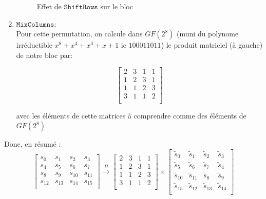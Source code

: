 \documentclass[a4paper, 12pt]{article}
\begin{document}
\begin{enumerate}
\begin{figure}[H]
		\caption{Effet de $\mathtt{ShiftRows}$ sur le bloc}
		\label{illu_shiftrows}
		\end{figure}

	\item $\mathtt{MixColumns}$: \\
		Pour cette permutation, on calcule dans $GF\left(2^8\right)$ (muni du polynome irréductible $x^8 + x^4 + x^3 + x + 1$ ie $100011011$) le produit matriciel (à gauche) de notre bloc par:
		
		$$
		\begin{bmatrix}
			2 & 3 & 1 & 1 \\
			1 & 2 & 3 & 1 \\
			1 & 1 & 2 & 3 \\
			3 & 1 & 1 & 2 \\
		\end{bmatrix}
		$$
		
		avec les éléments de cette matrices à comprendre comme des éléments de $GF\left(2^8\right)$ 
\end{enumerate}

\noindent Donc, en résumé : 
$$
\begin{bmatrix}
	s_{0} & s_{1} & s_{2} & s_{3} \\
	s_{4} & s_{5} & s_{6} & s_{7} \\
	s_{8} & s_{9} & s_{10} & s_{11} \\
	s_{12} & s_{13} & s_{14} & s_{15} \\
\end{bmatrix}
\overset{\Pi}{\rightarrow}
\begin{bmatrix}
	2 & 3 & 1 & 1 \\
	1 & 2 & 3 & 1 \\
	1 & 1 & 2 & 3 \\
	3 & 1 & 1 & 2 \\
\end{bmatrix}
\times
\begin{bmatrix}
	\tilde{s}_0 & \tilde{s}_1 & \tilde{s}_2 & \tilde{s}_3 \\
	\tilde{s}_5 & \tilde{s}_6 & \tilde{s}_7 & \tilde{s}_4 \\
	\tilde{s}_{10} & \tilde{s}_{11} & \tilde{s}_8 & \tilde{s}_9 \\
	\tilde{s}_{15} & \tilde{s}_{12} & \tilde{s}_{13} & \tilde{s}_{14} \\
\end{bmatrix}
$$
\end{document}
